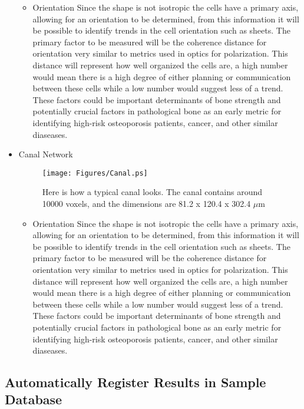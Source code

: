 \begin{itemize}
\begin{itemize}
		\item Orientation
Since the shape is not isotropic the cells have a primary axis, allowing for an orientation to be determined, from this information it will be possible to identify trends in the cell orientation such as sheets. The primary factor to be measured will be the coherence distance for orientation very similar to metrics used in optics for polarization. This distance will represent how well organized the cells are, a high number would mean there is a high degree of either planning or communication between these cells while a low number would suggest less of a trend. These factors could be important determinants of bone strength and potentially crucial factors in pathological bone as an early metric for identifying high-risk osteoporosis patients, cancer, and other similar diaseases.
	\end{itemize}
	\item Canal Network
\begin{figure}[htp]
 \centering
 \texttt{[image: Figures/Canal.ps]}
 \caption{Here is how a typical canal looks. The canal contains around 10000 voxels, and the dimensions are 81.2 x 120.4 x 302.4 $\mu$m}
 \label{fig:NormCanal}
\end{figure}	
	\begin{itemize}
		\item Orientation
Since the shape is not isotropic the cells have a primary axis, allowing for an orientation to be determined, from this information it will be possible to identify trends in the cell orientation such as sheets. The primary factor to be measured will be the coherence distance for orientation very similar to metrics used in optics for polarization. This distance will represent how well organized the cells are, a high number would mean there is a high degree of either planning or communication between these cells while a low number would suggest less of a trend. These factors could be important determinants of bone strength and potentially crucial factors in pathological bone as an early metric for identifying high-risk osteoporosis patients, cancer, and other similar diaseases.
	\end{itemize}
\end{itemize}


\subsection{Automatically Register Results in Sample Database}
